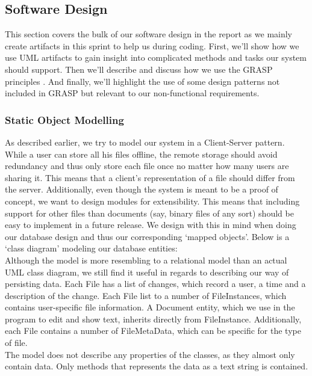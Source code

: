 \subsection{Software Design}
This section covers the bulk of our software design in the report as we mainly create artifacts in this sprint to help us during coding. First, we’ll show how we use UML artifacts to gain insight into complicated methods and tasks our system should support. Then we’ll describe and discuss how we use the GRASP principles \cite[p.~271, p.~413]{OOAD}. And finally, we’ll highlight the use of some design patterns not included in GRASP but relevant to our non-functional requirements.
\subsubsection{Static Object Modelling}
As described earlier, we try to model our system in a Client-Server pattern. While a user can store all his files offline, the remote storage should avoid redundancy and thus only store each file once no matter how many users are sharing it. This means that a client’s representation of a file should differ from the server. Additionally, even though the system is meant to be a proof of concept, we want to design modules for extensibility. This means that including support for other files than documents (say, binary files of any sort) should be easy to implement in a future release. We design with this in mind when doing our database design and thus our corresponding ‘mapped objects’. Below is a ‘class diagram’ modeling our database entities:\\
Although the model is more resembling to a relational model than an actual UML class diagram, we still find it useful in regards to describing our way of persisting data. Each File has a list of changes, which record a user, a time and a description of the change. Each File list to a number of FileInstances, which contains user-specific file information. A Document entity, which we use in the program to edit and show text, inherits directly from FileInstance. Additionally, each File contains a number of FileMetaData, which can be specific for the type of file.\\
The model does not describe any properties of the classes, as they almost only contain data. Only methods that represents the data as a text string is contained.

